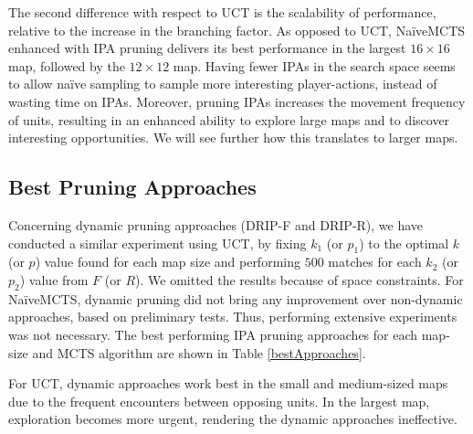\documentclass[conference]{IEEEtran}
\begin{document}
The second difference with respect to UCT is the scalability of performance, relative to the increase in the branching factor. As opposed to UCT, NaïveMCTS enhanced with IPA pruning delivers its best performance in the largest $16\times16$ map, followed by the $12\times12$ map. Having fewer IPAs in the search space seems to allow naïve sampling to sample more interesting player-actions, instead of wasting time on IPAs. Moreover, pruning IPAs increases the movement frequency of units, resulting in an enhanced ability to explore large maps and to discover interesting opportunities. We will see further how this translates to larger maps.


\subsection{Best Pruning Approaches}

Concerning dynamic pruning approaches (DRIP-F and DRIP-R), we have conducted a similar experiment using UCT, by fixing $k_1$ (or $p_1$) to the optimal $k$ (or $p$) value found for each map size and performing $500$ matches for each $k_2$ (or $p_2$) value from $F$ (or $R$). We omitted the results because of space constraints. For NaïveMCTS, dynamic pruning did not bring any improvement over non-dynamic approaches, based on preliminary tests. Thus, performing extensive experiments was not necessary. The best performing IPA pruning approaches for each map-size and MCTS algorithm are shown in Table \ref{bestApproaches}.

\begin{table}[!h]
\renewcommand{\arraystretch}{1.3}
\caption{Best Performing Pruning Approaches}
\label{bestApproaches}
\centering
{}
\end{table}

For UCT, dynamic approaches work best in the small and medium-sized maps due to the frequent encounters between opposing units. In the largest map, exploration becomes more urgent, rendering the dynamic approaches ineffective.
\end{document}
